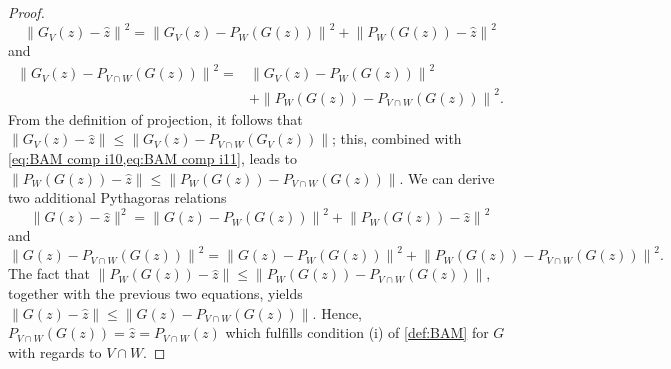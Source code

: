 \documentclass[smallextended,numbook,nospthms]{svjour3}
\theoremstyle{plain}
\theoremstyle{definition}
\begin{document}
\begin{proof}
	\begin{equation}\label{eq:BAM comp i10}
		\left\|G_{V}(z)-\hat{z}\right\|^{2}=\left\|G_{V}(z)-P_{W}(G(z))\right\|^{2}+\left\|P_{W}(G(z))-\hat{z}\right\|^{2}
	\end{equation}
	and
	\begin{align}
		\left\|G_{V}(z)-P_{V \cap W}(G(z))\right\|^{2}=&\left\|G_{V}(z)-P_{W}(G(z))\right\|^{2} \\
		&+\left\|P_{W}(G(z))-P_{V \cap W}(G(z))\right\|^{2}. \label{eq:BAM comp i11}
	\end{align}
	From the definition of projection, it follows that $\left\|G_{V}(z)-\hat{z}\right\| \leq\left\|G_{V}(z)-P_{V \cap W}\left(G_{V}(z)\right)\right\|$; this, combined with \cref{eq:BAM comp i10,eq:BAM comp i11}, leads to $\left\|P_{W}(G(z))-\hat{z}\right\| \leq\left\|P_{W}(G(z))-P_{V \cap W}(G(z))\right\|$.
	We can derive two additional Pythagoras relations
	\begin{equation}\label{eq:BAM comp i12}
		\|G(z)-\hat{z}\|^{2}=\left\|G(z)-P_{W}(G(z))\right\|^{2}+\left\|P_{W}(G(z))-\hat{z}\right\|^{2}
	\end{equation}
	and
	\begin{equation}\label{eq:BAM comp i13}
		\left\|G(z)-P_{V \cap W}(G(z))\right\|^{2}=\left\|G(z)-P_{W}(G(z))\right\|^{2}+\left\|P_{W}(G(z))-P_{V \cap W}(G(z))\right\|^{2}.
	\end{equation}
	The fact that $\left\|P_{W}(G(z))-\hat{z}\right\| \leq\left\|P_{W}(G(z))-P_{V \cap W}(G(z))\right\|$, together with the previous two equations, yields $\|G(z)-\hat{z}\| \leq\left\|G(z)-P_{V \cap W}(G(z))\right\| .$ Hence, $P_{V \cap W}(G(z))=\hat{z}=P_{V \cap W}(z)$ which fulfills condition (i) of \cref{def:BAM} for $G$ with regards to $V \cap W$.
	

\end{proof}
\end{document}
